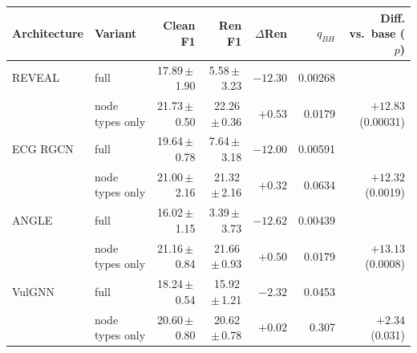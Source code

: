 \begin{tabular}{llrrrrr}
\toprule
Architecture & Variant & Clean F1 & Ren F1 & $\Delta$Ren & $q_{BH}$ & Diff. vs.\ base ($p$) \\
\midrule
REVEAL & full & 17.89\,$\pm$\,1.90 & 5.58\,$\pm$\,3.23 & $\mathbf{-12.30}$ & 0.00268 &  \\
 & node types only & 21.73\,$\pm$\,0.50 & 22.26\,$\pm$\,0.36 & $\mathbf{+0.53}$ & 0.0179 & $+12.83$ (0.00031) \\
\midrule
ECG RGCN & full & 19.64\,$\pm$\,0.78 & 7.64\,$\pm$\,3.18 & $\mathbf{-12.00}$ & 0.00591 &  \\
 & node types only & 21.00\,$\pm$\,2.16 & 21.32\,$\pm$\,2.16 & $+0.32$ & 0.0634 & $+12.32$ (0.0019) \\
\midrule
ANGLE & full & 16.02\,$\pm$\,1.15 & 3.39\,$\pm$\,3.73 & $\mathbf{-12.62}$ & 0.00439 &  \\
 & node types only & 21.16\,$\pm$\,0.84 & 21.66\,$\pm$\,0.93 & $\mathbf{+0.50}$ & 0.0179 & $+13.13$ (0.0008) \\
\midrule
VulGNN & full & 18.24\,$\pm$\,0.54 & 15.92\,$\pm$\,1.21 & $\mathbf{-2.32}$ & 0.0453 &  \\
 & node types only & 20.60\,$\pm$\,0.80 & 20.62\,$\pm$\,0.78 & $+0.02$ & 0.307 & $+2.34$ (0.031) \\
\bottomrule
\end{tabular}
